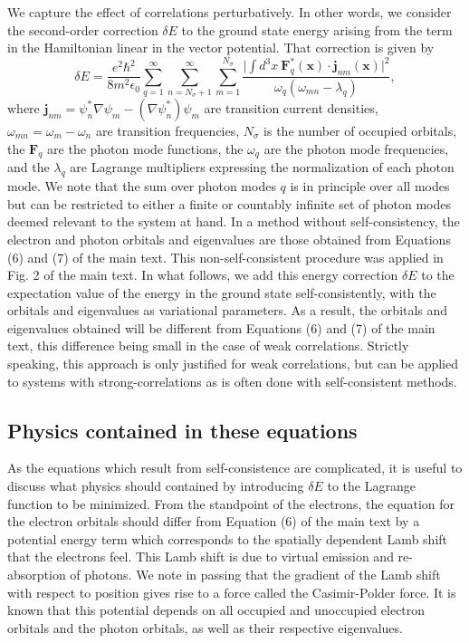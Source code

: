 \documentclass[aps,prb,onecolumn,preprint,
	groupedaddress,superscriptaddress,
	amsfonts,amssymb,amsmath,floatfix,
	citeautoscript]{revtex4-1}
\begin{document}
We capture the effect of correlations perturbatively. In other words, we consider the second-order correction $\delta E$ to the ground state energy arising from the term in the Hamiltonian linear in the vector potential. That correction is given by
\begin{equation}
\delta E = \frac{e^2\hbar^2}{8m^2\epsilon_0}\sum\limits_{q=1}^{\infty}\sum_{n=N_{\sigma}+1}^{\infty}\sum\limits_{m=1}^{N_{\sigma}} \frac{\Big| \int d^3x~\mathbf{F}_q^*(\mathbf{x})\cdot\mathbf{j}_{nm}(\mathbf{x})\Big|^2}{\omega_q(\omega_{mn} -\lambda_q)},
\end{equation}
where $\mathbf{j}_{nm} = \psi^*_n\nabla\psi_m - (\nabla\psi^*_n)\psi_m$ are transition current densities, $\omega_{mn} = \omega_m - \omega_n$ are transition frequencies, $N_{\sigma}$ is the number of occupied orbitals, the $\textbf{F}_q$ are the photon mode functions, the $\omega_q$ are the photon mode frequencies, and the $\lambda_q$ are Lagrange multipliers expressing the normalization of each photon mode. We note that the sum over photon modes $q$ is in principle over all modes but can be restricted to either a finite or countably infinite set of photon modes deemed relevant to the system at hand.  In a method without self-consistency, the electron and photon orbitals and eigenvalues are those obtained from Equations (6) and (7) of the main text. This non-self-consistent procedure was applied in Fig. 2 of the main text. In what follows, we add this energy correction $\delta E$ to the expectation value of the energy in the ground state self-consistently, with the orbitals and eigenvalues as variational parameters. As a result, the orbitals and eigenvalues obtained will be different from Equations (6) and (7) of the main text, this difference being small in the case of weak correlations. Strictly speaking, this approach is only justified for weak correlations, but can be applied to systems with strong-correlations as is often done with self-consistent methods. 

\subsection{Physics contained in these equations}

As the equations which result from self-consistence are complicated, it is useful to discuss what physics should contained by introducing $\delta E$ to the Lagrange function to be minimized. From the standpoint of the electrons, the equation for the electron orbitals should differ from Equation (6) of the main text by a potential energy term which corresponds to the spatially dependent Lamb shift  that the electrons feel. This Lamb shift is due to virtual emission and re-absorption of photons. We note in passing that the gradient of the Lamb shift with respect to position gives rise to a force called the Casimir-Polder force.  It is known that this potential depends on all occupied and unoccupied electron orbitals and the photon orbitals, as well as their respective eigenvalues. 
\end{document}
